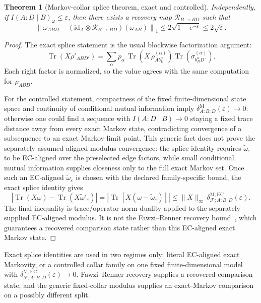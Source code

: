 \documentclass[11pt]{article}
\newtheorem{theorem}{Theorem}[section]
\theoremstyle{remark}
\theoremstyle{plain}
\begin{document}
\begin{theorem}[Markov-collar splice theorem, exact and controlled]
Independently, if \(I(A:D\mid B)_\omega\le \varepsilon\), then there exists a recovery map \(\mathcal R_{B\to BD}\) such that
\[
\left\|
\omega_{ABD}
-
(\mathrm{id}_A\otimes \mathcal R_{B\to BD})(\omega_{AB})
\right\|_1
\le
2\sqrt{1-e^{-\varepsilon}}
\le
2\sqrt{\varepsilon}.
\]
\end{theorem}

\begin{proof}
The exact splice statement is the usual blockwise factorization argument:
\[
\operatorname{Tr}(X\rho'_{AB D'})
=
\sum_\alpha
p_\alpha\,
\operatorname{Tr}\!\left(
X\, \rho^{(\alpha)}_{A b_L^\alpha}
\right)
\operatorname{Tr}\!\left(\sigma_{b_R^\alpha D'}^{(\alpha)}\right).
\]
Each right factor is normalized, so the value agrees with the same computation for \(\rho_{ABD}\).

For the controlled statement, compactness of the fixed finite-dimensional state space and continuity of conditional mutual information imply \(\delta^{\mathrm M}_{A:B:D}(\varepsilon)\to0\): otherwise one could find a sequence with \(I(A:D\mid B)\to0\) staying a fixed trace distance away from every exact Markov state, contradicting convergence of a subsequence to an exact Markov limit point. This generic fact does not prove the separately assumed aligned-modulus convergence: the splice identity requires \(\widetilde\omega_\varepsilon\) to be EC-aligned over the preselected edge factors, while small conditional mutual information supplies closeness only to the full exact Markov set. Once such an EC-aligned \(\widetilde\omega_\varepsilon\) is chosen with the declared family-specific bound, the exact splice identity gives
\[
\left|
\operatorname{Tr}(X\omega)-\operatorname{Tr}(X\widetilde\omega'_\varepsilon)
\right|
=
\left|
\operatorname{Tr}\!\left[X(\omega-\widetilde\omega_\varepsilon)\right]
\right|
\le
\|X\|_\infty\,
\delta^{\mathrm{M,EC}}_{\mathcal F;A:B:D}(\varepsilon).
\]
The final inequality is trace/operator-norm duality applied to the separately supplied EC-aligned modulus. It is not the Fawzi--Renner recovery bound~\cite{fawziRenner15}, which guarantees a recovered comparison state rather than this EC-aligned exact Markov state.
\end{proof}

Exact splice identities are used in two regimes only: literal EC-aligned
exact Markovity, or a controlled collar family on one fixed
finite-dimensional model with
\(\delta^{\mathrm{M,EC}}_{\mathcal F;A:B:D}(\varepsilon)\to0\). Fawzi--Renner
recovery supplies a recovered comparison state, and the generic fixed-collar
modulus supplies an exact-Markov comparison on a possibly different split.
\end{document}
